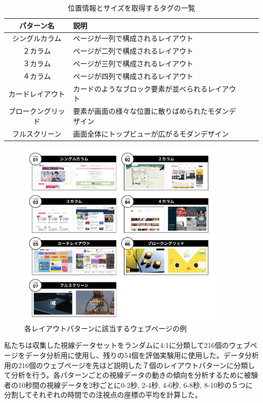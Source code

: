 \begin{table}[h]
  \caption{位置情報とサイズを取得するタグの一覧}
  \label{table:layoutpattern}
  \centering
    \begin{tabular}{clll}
    \hline
    パターン名 & 説明 \\
    \hline \hline
    シングルカラム & ページが一列で構成されるレイアウト \\
    ２カラム & ページが二列で構成されるレイアウト \\
    ３カラム & ページが三列で構成されるレイアウト \\
    ４カラム & ページが四列で構成されるレイアウト \\
    カードレイアウト & カードのようなブロック要素が並べられるレイアウト \\
    ブロークングリッド & 要素が画面の様々な位置に散りばめられたモダンデザイン \\
    フルスクリーン & 画面全体にトップビューが広がるモダンデザイン \\
    \hline
  \end{tabular}
\end{table}

\begin{figure}[H]
  \centering
  \includegraphics[width=10cm]{figures/05_layout.jpg}
  \caption{各レイアウトパターンに該当するウェブページの例}
  \label{fig_layout_example}
\end{figure}

\par 私たちは収集した視線データセットをランダムに4:1に分類して216個のウェブページをデータ分析用に使用し、残りの54個を評価実験用に使用した。データ分析用の216個のウェブページを先ほど説明した７個のレイアウトパターンに分類して分析を行う。各パターンごとの視線データの動きの傾向を分析するために被験者の10秒間の視線データを2秒ごとに0-2秒, 2-4秒, 4-6秒, 6-8秒, 8-10秒の５つに分割してそれぞれの時間での注視点の座標の平均を計算した。

